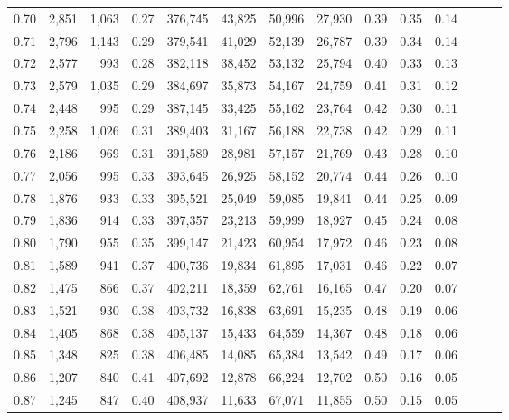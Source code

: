 \begin{tabular}{rrrrrrrrrrrrrr}
0.70 &   2,851 &  1,063 &  0.27 &  376,745 &   43,825 &  50,996 &  27,930 &  0.39 &  0.35 &      0.14 \\
0.71 &   2,796 &  1,143 &  0.29 &  379,541 &   41,029 &  52,139 &  26,787 &  0.39 &  0.34 &      0.14 \\
0.72 &   2,577 &    993 &  0.28 &  382,118 &   38,452 &  53,132 &  25,794 &  0.40 &  0.33 &      0.13 \\
0.73 &   2,579 &  1,035 &  0.29 &  384,697 &   35,873 &  54,167 &  24,759 &  0.41 &  0.31 &      0.12 \\
0.74 &   2,448 &    995 &  0.29 &  387,145 &   33,425 &  55,162 &  23,764 &  0.42 &  0.30 &      0.11 \\
0.75 &   2,258 &  1,026 &  0.31 &  389,403 &   31,167 &  56,188 &  22,738 &  0.42 &  0.29 &      0.11 \\
0.76 &   2,186 &    969 &  0.31 &  391,589 &   28,981 &  57,157 &  21,769 &  0.43 &  0.28 &      0.10 \\
0.77 &   2,056 &    995 &  0.33 &  393,645 &   26,925 &  58,152 &  20,774 &  0.44 &  0.26 &      0.10 \\
0.78 &   1,876 &    933 &  0.33 &  395,521 &   25,049 &  59,085 &  19,841 &  0.44 &  0.25 &      0.09 \\
0.79 &   1,836 &    914 &  0.33 &  397,357 &   23,213 &  59,999 &  18,927 &  0.45 &  0.24 &      0.08 \\
0.80 &   1,790 &    955 &  0.35 &  399,147 &   21,423 &  60,954 &  17,972 &  0.46 &  0.23 &      0.08 \\
0.81 &   1,589 &    941 &  0.37 &  400,736 &   19,834 &  61,895 &  17,031 &  0.46 &  0.22 &      0.07 \\
0.82 &   1,475 &    866 &  0.37 &  402,211 &   18,359 &  62,761 &  16,165 &  0.47 &  0.20 &      0.07 \\
0.83 &   1,521 &    930 &  0.38 &  403,732 &   16,838 &  63,691 &  15,235 &  0.48 &  0.19 &      0.06 \\
0.84 &   1,405 &    868 &  0.38 &  405,137 &   15,433 &  64,559 &  14,367 &  0.48 &  0.18 &      0.06 \\
0.85 &   1,348 &    825 &  0.38 &  406,485 &   14,085 &  65,384 &  13,542 &  0.49 &  0.17 &      0.06 \\
0.86 &   1,207 &    840 &  0.41 &  407,692 &   12,878 &  66,224 &  12,702 &  0.50 &  0.16 &      0.05 \\
0.87 &   1,245 &    847 &  0.40 &  408,937 &   11,633 &  67,071 &  11,855 &  0.50 &  0.15 &      0.05 \\

\end{tabular}

